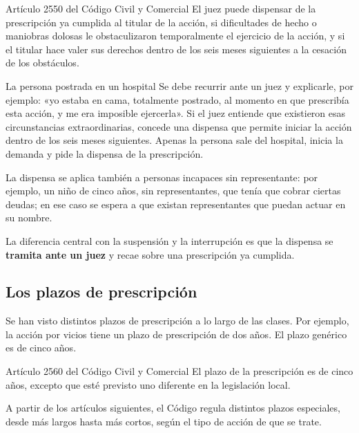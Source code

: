 \documentclass[12pt,oneside]{book}
\begin{document}
\begin{articulo}{Artículo 2550 del Código Civil y Comercial}
El juez puede dispensar de la prescripción ya cumplida al titular de la acción, si dificultades de hecho o maniobras dolosas le obstaculizaron temporalmente el ejercicio de la acción, y si el titular hace valer sus derechos dentro de los seis meses siguientes a la cesación de los obstáculos.
\end{articulo}

\begin{example}{La persona postrada en un hospital}
Se debe recurrir ante un juez y explicarle, por ejemplo: «yo estaba en cama, totalmente postrado, al momento en que prescribía esta acción, y me era imposible ejercerla». Si el juez entiende que existieron esas circunstancias extraordinarias, concede una dispensa que permite iniciar la acción dentro de los seis meses siguientes. Apenas la persona sale del hospital, inicia la demanda y pide la dispensa de la prescripción.
\end{example}

La dispensa se aplica también a personas incapaces sin representante: por ejemplo, un niño de cinco años, sin representantes, que tenía que cobrar ciertas deudas; en ese caso se espera a que existan representantes que puedan actuar en su nombre.

\begin{important}
La diferencia central con la suspensión y la interrupción es que la dispensa se \textbf{tramita ante un juez} y recae sobre una prescripción ya cumplida.
\end{important}

\subsection{Los plazos de prescripción}

Se han visto distintos plazos de prescripción a lo largo de las clases. Por ejemplo, la acción por vicios tiene un plazo de prescripción de dos años. El plazo genérico es de cinco años.

\begin{articulo}{Artículo 2560 del Código Civil y Comercial}
El plazo de la prescripción es de cinco años, excepto que esté previsto uno diferente en la legislación local.
\end{articulo}

A partir de los artículos siguientes, el Código regula distintos plazos especiales, desde más largos hasta más cortos, según el tipo de acción de que se trate.
\end{document}
